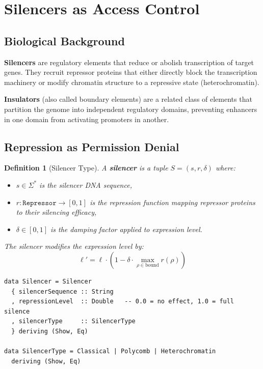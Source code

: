 \documentclass[12pt,a4paper]{article}
\newtheorem{definition}[theorem]{Definition}
\begin{document}
\section{Silencers as Access Control}\label{sec:silencers}

\subsection{Biological Background}

\textbf{Silencers} are regulatory elements that reduce or abolish transcription of target genes.  They recruit repressor proteins that either directly block the transcription machinery or modify chromatin structure to a repressive state (heterochromatin).

\textbf{Insulators} (also called boundary elements) are a related class of elements that partition the genome into independent regulatory domains, preventing enhancers in one domain from activating promoters in another.

\subsection{Repression as Permission Denial}

\begin{definition}[Silencer Type]\label{def:silencer}
A \textbf{silencer} is a tuple $S = (s, r, \delta)$ where:
\begin{itemize}
  \item $s \in \Sigma^*$ is the silencer DNA sequence,
  \item $r : \texttt{Repressor} \to [0,1]$ is the \emph{repression function} mapping repressor proteins to their silencing efficacy,
  \item $\delta \in [0,1]$ is the \emph{damping factor} applied to expression level.
\end{itemize}
The silencer modifies the expression level by:
\[
\ell' = \ell \cdot (1 - \delta \cdot \max_{\rho \in \text{bound}} r(\rho))
\]
\end{definition}

\begin{lstlisting}[caption={Silencer type definition}]
data Silencer = Silencer
  { silencerSequence :: String
  , repressionLevel  :: Double   -- 0.0 = no effect, 1.0 = full silence
  , silencerType     :: SilencerType
  } deriving (Show, Eq)

data SilencerType = Classical | Polycomb | Heterochromatin
  deriving (Show, Eq)
\end{lstlisting}
\end{document}
